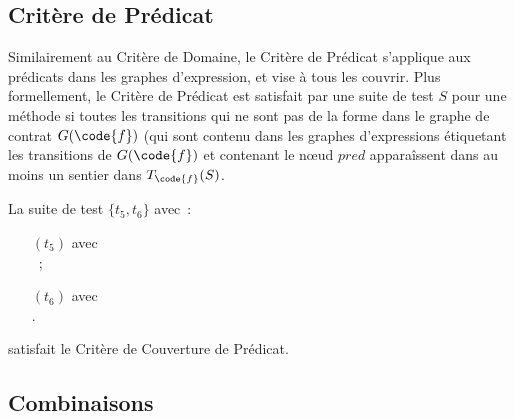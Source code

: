 \subsection{Critère de Prédicat}

Similairement au Critère de Domaine, le Critère de Prédicat s'applique aux
prédicats dans les graphes d'expression, et vise à tous les couvrir. Plus
formellement, le Critère de Prédicat est satisfait par une suite de test $S$
pour une méthode  si toutes les transitions qui ne sont pas de la forme
 dans le graphe de contrat $G(\code{f})$ (qui sont contenu dans
les graphes d'expressions étiquetant les transitions de $G(\code{f})$ et
contenant le nœud $\mathit{pred}$ apparaîssent dans au moins un sentier dans
$T_\code{f}(S)$.

\begin{example}

La suite de test $\{t_5, t_6\}$ avec~:
%
\begin{itemize}

\item[$(t_5)$]  avec \\
~;

\item[$(t_6)$]  avec \\
.

\end{itemize}
%
satisfait le Critère de Couverture de Prédicat.

\end{example}

\subsection{Combinaisons}

